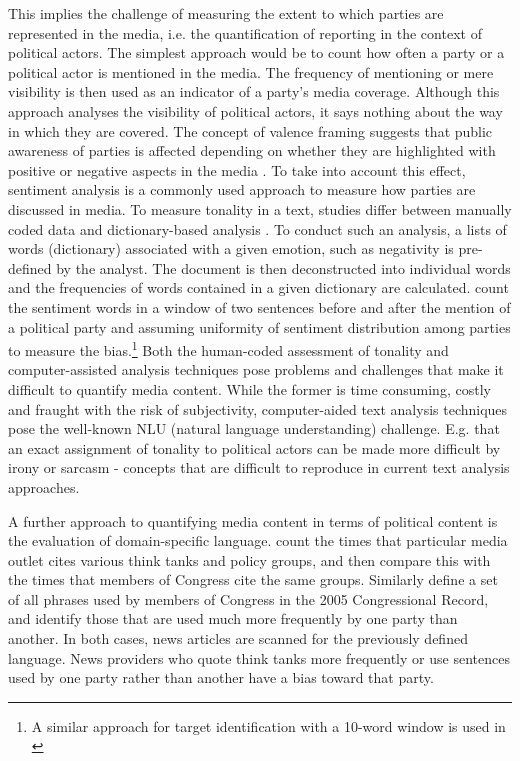 \documentclass[12pt,a4paper,notitlepage]{article}
\begin{document}
This implies the challenge of measuring the extent to which parties are represented in the media, i.e. the quantification of reporting in the context of political actors. The simplest approach would be to count how often a party or a political actor is mentioned in the media. The frequency of mentioning or mere visibility is then used as an indicator of a party's media coverage. Although this approach analyses the visibility of political actors, it says nothing about the way in which they are covered. The concept of valence framing suggests that public awareness of parties is affected depending on whether they are highlighted with positive or negative aspects in the media \citep{de_vreese_valenced_2006, hurtikova_importance_2017}. To take into account this effect, sentiment analysis is a commonly used approach to measure how parties are discussed in media. To measure tonality in a text, studies differ between manually coded data \citep{eberl_one_2017, dewenter_can_2018} and dictionary-based analysis \citep{junque_de_fortuny_media_2012}. To conduct such an analysis, a lists of words (dictionary) associated with a given emotion, such as negativity is pre-defined by the analyst. The document is then deconstructed into individual words and the frequencies of words contained in a given dictionary are calculated. \citet{junque_de_fortuny_media_2012} count the sentiment words in a window of two sentences before and after the mention of a political party and assuming uniformity of sentiment distribution among parties to measure the bias.\footnote{A similar approach for target identification with a 10-word window is used in \citet{balahur_sentiment_2013}} Both the human-coded assessment of tonality and computer-assisted analysis techniques pose problems and challenges that make it difficult to quantify media content. While the former is time consuming, costly and fraught with the risk of subjectivity, computer-aided text analysis techniques pose the well-known NLU (natural language understanding) challenge. E.g. that an exact assignment of tonality to political actors can be made more difficult by irony or sarcasm - concepts that are difficult to reproduce in current text analysis approaches.

A further approach to quantifying media content in terms of political content is the evaluation of domain-specific language. \citet{groseclose_measure_2005} count the times that particular media outlet cites various think tanks and policy groups, and then compare this with the times that members of Congress cite the same groups. Similarly \citet{gentzkow_what_2010} define a set of all phrases used by members of Congress in the 2005 Congressional Record, and identify those that are used much more frequently by one party than another. In both cases, news articles are scanned for the previously defined language. News providers who quote think tanks more frequently or use sentences used by one party rather than another have a bias toward that party. 
\end{document}
